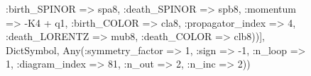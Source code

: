\documentclass{revtex4}
\begin{document}
\begin{figure}[!htb]
\begin{center}
{:birth_SPINOR => spa8, :death_SPINOR => spb8, :momentum => -K4 + q1, :birth_COLOR => cla8, :propagator_index => 4, :death_LORENTZ => mub8, :death_COLOR => clb8))], Dict{Symbol, Any}(:symmetry_factor => 1, :sign => -1, :n_loop => 1, :diagram_index => 81, :n_out => 2, :n_inc => 2)) 
}
\end{center}
\end{figure}
\end{document}

